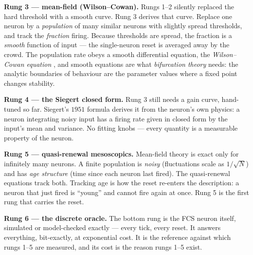 \documentclass[conference]{IEEEtran}
\begin{document}
\textbf{Rung 3 --- mean-field (Wilson--Cowan).} Rungs 1--2 silently replaced the
hard threshold with a smooth curve. Rung 3 derives that curve. Replace one
neuron by a \emph{population} of many similar neurons with slightly spread
thresholds, and track the \emph{fraction} firing. Because thresholds are
spread, the fraction is a \emph{smooth} function of input --- the single-neuron
reset is averaged away by the crowd. The population rate obeys a smooth
differential equation, the \emph{Wilson--Cowan equation} \cite{WilsonCowan1972},
and smooth equations are what \emph{bifurcation theory} needs: the analytic
boundaries of behaviour are the parameter values where a fixed point changes
stability.

\textbf{Rung 4 --- the Siegert closed form.} Rung 3 still needs a gain curve,
hand-tuned so far. Siegert's $1951$ formula \cite{Siegert1951,Brunel2000}
derives it from the neuron's own physics: a neuron integrating noisy input has
a firing rate given in closed form by the input's mean and variance. No fitting
knobs --- every quantity is a measurable property of the neuron.

\textbf{Rung 5 --- quasi-renewal mesoscopics.} Mean-field theory is exact only
for infinitely many neurons. A finite population is \emph{noisy} (fluctuations
scale as $1/\sqrt{N}$) and has \emph{age structure} (time since each neuron last
fired). The quasi-renewal equations \cite{NaudGerstner2012} track both.
Tracking age is how the reset re-enters the description: a neuron that just
fired is ``young'' and cannot fire again at once. Rung 5 is the first rung that
carries the reset.

\textbf{Rung 6 --- the discrete oracle.} The bottom rung is the FCS neuron
itself, simulated or model-checked exactly --- every tick, every reset. It
answers everything, bit-exactly, at exponential cost. It is the reference
against which rungs 1--5 are measured, and its cost is the reason rungs 1--5
exist.
\end{document}
